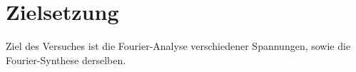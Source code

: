 \section{Zielsetzung}
\label{sec:Ziel}
Ziel des Versuches ist die Fourier-Analyse verschiedener Spannungen,
sowie die Fourier-Synthese derselben.
